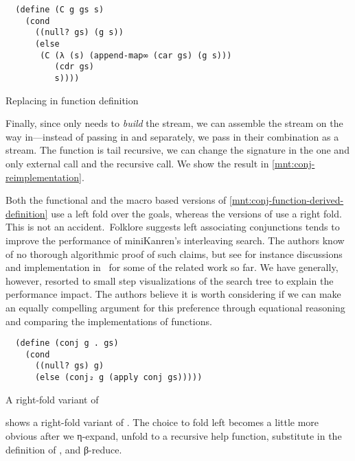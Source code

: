 \documentclass[sigplan,draft,balance,pbalance,natbib=false]{acmart}
\begin{document}
\begin{listing}[h]
\begin{verbatim}
  (define (C g gs s)
    (cond
      ((null? gs) (g s))
      (else
       (C (λ (s) (append-map∞ (car gs) (g s)))
          (cdr gs)
          s))))
\end{verbatim}
  \caption{Replacing  in  function definition}
  \label{mnt:C-substituted-through}
\end{listing}

Finally, since  only needs  to
\emph{build} the stream, we can assemble the stream on the way
in---instead of passing in  and 
separately, we pass in their combination as a stream. The function is
tail recursive, we can change the signature in the one and only
external call and the recursive call. We show the result
in \cref{mnt:conj-reimplementation}.

Both the functional and the macro based versions of
\cref{mnt:conj-function-derived-definition} use a left fold over the
goals, whereas the versions of  use a right fold.
This is not an accident.\ Folklore suggests left associating
conjunctions tends to improve the performance of miniKanren's
interleaving search. The authors know of no thorough algorithmic proof
of such claims, but see for instance discussions and implementation
in~\cite{rosenblatt2019first} for some of the related work so far. We
have generally, however, resorted to small step visualizations of the
search tree to explain the performance impact. The authors believe it
is worth considering if we can make an equally compelling argument for
this preference through equational reasoning and comparing the
implementations of functions.

\begin{listing}[h]
\begin{verbatim}
  (define (conj g . gs)
    (cond
      ((null? gs) g)
      (else (conj₂ g (apply conj gs)))))
\end{verbatim}
  \caption{A right-fold variant of }
  \label{mnt:conj-right-fold-definition}
\end{listing}

 shows a right-fold variant of
. The choice to fold left becomes a little more
obvious after we η-expand, unfold to a recursive help function,
substitute in the definition of , and β-reduce.
\end{document}
